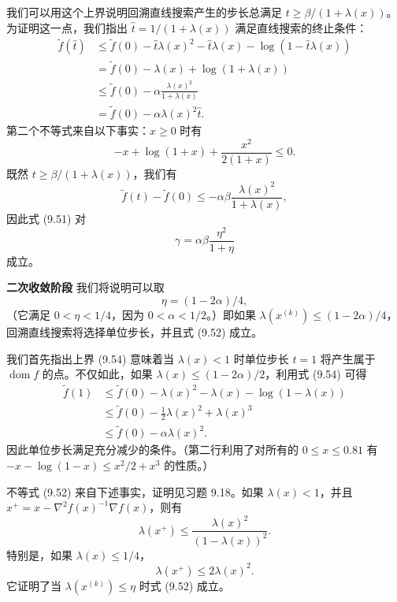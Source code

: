 \documentclass[UTF8,12pt,a4paper,fontset=fandol]{ctexart}
\begin{document}
我们可以用这个上界说明回溯直线搜索产生的步长总满足 $t\geq\beta/(1+\lambda(x))$。为证明这一点，我们指出 $\hat{t}=1/(1+\lambda(x))$ 满足直线搜索的终止条件：
\[
\begin{aligned}
\tilde{f}(\hat{t})
&\leq \tilde{f}(0)-\hat{t}\lambda(x)^2-\hat{t}\lambda(x)-\log(1-\hat{t}\lambda(x))\\
&=\tilde{f}(0)-\lambda(x)+\log(1+\lambda(x))\\
&\leq \tilde{f}(0)-\alpha\frac{\lambda(x)^2}{1+\lambda(x)}\\
&=\tilde{f}(0)-\alpha\lambda(x)^2\hat{t}.
\end{aligned}
\]
第二个不等式来自以下事实：$x\geq0$ 时有
\[
-x+\log(1+x)+\frac{x^2}{2(1+x)}\leq0.
\]
既然 $t\geq\beta/(1+\lambda(x))$，我们有
\[
\tilde{f}(t)-\tilde{f}(0)\leq-\alpha\beta\frac{\lambda(x)^2}{1+\lambda(x)},
\]
因此式 (9.51) 对
\[
\gamma=\alpha\beta\frac{\eta^2}{1+\eta}
\]
成立。

\noindent\textbf{二次收敛阶段}\quad
我们将说明可以取
\[
\eta=(1-2\alpha)/4,
\]
（它满足 $0<\eta<1/4$，因为 $0<\alpha<1/2$。）即如果 $\lambda(x^{(k)})\leq(1-2\alpha)/4$，回溯直线搜索将选择单位步长，并且式 (9.52) 成立。

我们首先指出上界 (9.54) 意味着当 $\lambda(x)<1$ 时单位步长 $t=1$ 将产生属于 $\operatorname{dom} f$ 的点。不仅如此，如果 $\lambda(x)\leq(1-2\alpha)/2$，利用式 (9.54) 可得
\[
\begin{aligned}
\tilde{f}(1)
&\leq \tilde{f}(0)-\lambda(x)^2-\lambda(x)-\log(1-\lambda(x))\\
&\leq \tilde{f}(0)-\frac{1}{2}\lambda(x)^2+\lambda(x)^3\\
&\leq \tilde{f}(0)-\alpha\lambda(x)^2.
\end{aligned}
\]
因此单位步长满足充分减少的条件。（第二行利用了对所有的 $0\leq x\leq0.81$ 有 $-x-\log(1-x)\leq x^2/2+x^3$ 的性质。）

不等式 (9.52) 来自下述事实，证明见习题 9.18。如果 $\lambda(x)<1$，并且 $x^+=x-\nabla^2 f(x)^{-1}\nabla f(x)$，则有
\begin{equation}
\lambda(x^+)\leq \frac{\lambda(x)^2}{(1-\lambda(x))^2}.
\tag{9.55}
\end{equation}
特别是，如果 $\lambda(x)\leq1/4$，
\[
\lambda(x^+)\leq2\lambda(x)^2.
\]
它证明了当 $\lambda(x^{(k)})\leq\eta$ 时式 (9.52) 成立。
\end{document}
